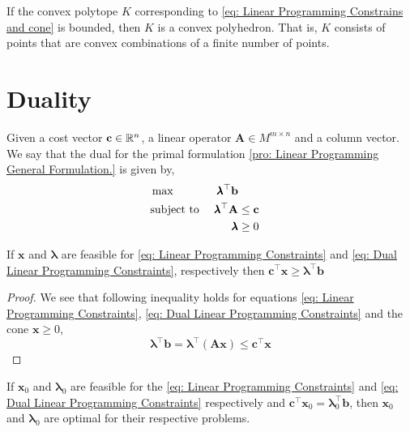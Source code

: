 \begin{corollary}
	If the convex polytope $K$ corresponding to \eqref{eq: Linear Programming Constrains and cone} is bounded, then $K$ is a convex polyhedron. That is, $K$ consists of points that are convex combinations of a finite number of points.
\end{corollary}

\section{Duality}

\begin{problem}
	\label{pro: Linear Programming Dual Formulation.}
	Given a cost vector $\mathbf{c}\in \mathbb{R}^n$, a linear operator $\mathbf{A}\in M^{m\times n}$ and a column vector. We say that the dual for the primal formulation \ref{pro: Linear Programming General Formulation.} is given by,	
	\begin{align}
		&\max & \pmb{\lambda}^\top\mathbf{b} \label{eq: Dual Linear Programming Max}&\\
		&\text{subject to }& \pmb{\lambda}^\top\mathbf{A}&\leq \mathbf{c} & \label{eq: Dual Linear Programming Constraints} \\
		& &\pmb{\lambda}&\geq 0 & \label{eq: Dual Linear Programming cone}
	\end{align}
\end{problem}

\begin{lemma}
If $\mathbf{x}$ and $\pmb{\lambda}$ are feasible for \eqref{eq: Linear Programming Constraints} and \eqref{eq: Dual Linear Programming Constraints}, respectively then $\mathbf{c}^\top\mathbf{x}\geq \pmb{\lambda}^\top\mathbf{b}$
\end{lemma}

\begin{proof}
	We see that following inequality holds for equations \eqref{eq: Linear Programming Constraints}, \eqref{eq: Dual Linear Programming Constraints} and the cone $\mathbf{x}\geq 0$,
	\begin{equation}
			\pmb{\lambda}^\top \mathbf{b}=\pmb{\lambda}^\top\left(\mathbf{Ax}\right)\leq \mathbf{c}^\top\mathbf{x}
	\end{equation}
\end{proof}

\begin{corollary}
	\label{cor: Dual Primal equality}
	If $\mathbf{x}_0$ and $\pmb{\lambda}_0$ are feasible for the \eqref{eq: Linear Programming Constraints} and \eqref{eq: Dual Linear Programming Constraints} respectively and  $\mathbf{c}^\top \mathbf{x}_0=\pmb{\lambda}_0^\top\mathbf{b}$, then $\mathbf{x}_0$ and $\pmb{\lambda}_0$ are optimal for their respective problems.
\end{corollary}

